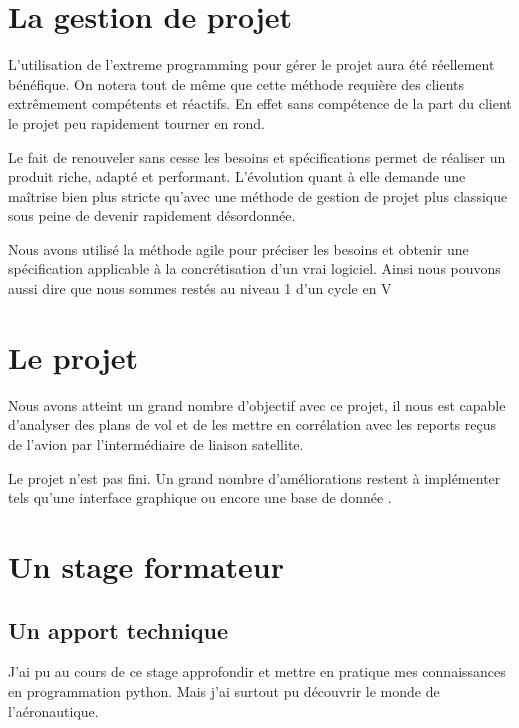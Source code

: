 
\section{La gestion de projet}
L'utilisation de l'extreme programming pour gérer le projet aura été réellement bénéfique. On notera tout de même que cette méthode requière des clients extrêmement compétents et réactifs. En effet sans compétence de la part du client le projet peu rapidement tourner en rond.

Le fait de renouveler sans cesse les besoins et spécifications permet de réaliser un produit riche, adapté et performant. L'évolution quant à elle demande une maîtrise bien plus stricte qu'avec une méthode de gestion de projet plus classique sous peine de devenir rapidement désordonnée.

Nous avons utilisé la méthode agile pour préciser les besoins et obtenir une spécification applicable à la concrétisation d'un vrai logiciel. Ainsi nous pouvons aussi dire que nous sommes restés au niveau 1 d'un cycle en V

\section{Le projet}
Nous avons atteint un grand nombre d'objectif avec ce projet, il nous est capable d'analyser des plans de vol et de les mettre en corrélation avec les reports reçus de l'avion par l'intermédiaire de liaison satellite.

Le projet n'est pas fini. Un grand nombre d'améliorations restent à implémenter tels qu'une interface graphique ou encore une base de donnée .

\section{Un stage formateur}
    \subsection{Un apport technique}
J'ai pu au cours de ce stage approfondir et mettre en pratique mes connaissances en programmation python. Mais j'ai surtout pu découvrir le monde de l'aéronautique. 

